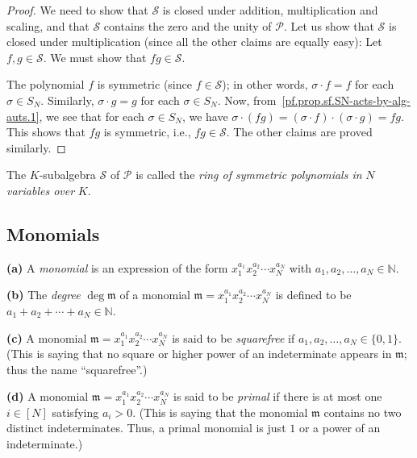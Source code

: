 \begin{proof}
\leanok
We need to show that $\mathcal{S}$ is closed under addition, multiplication and scaling, and that
$\mathcal{S}$ contains the zero and the unity of $\mathcal{P}$. Let us show
that $\mathcal{S}$ is closed under multiplication (since all the other
claims are equally easy): Let $f, g \in \mathcal{S}$. We must show that
$fg \in \mathcal{S}$.

The polynomial $f$ is symmetric (since $f \in \mathcal{S}$); in other words,
$\sigma \cdot f = f$ for each $\sigma \in S_N$. Similarly, $\sigma \cdot g = g$ for
each $\sigma \in S_N$. Now, from~\eqref{pf.prop.sf.SN-acts-by-alg-auts.1}, we
see that
for each $\sigma \in S_N$, we have
$\sigma \cdot (fg) = (\sigma \cdot f) \cdot (\sigma \cdot g) = fg$.
This shows that $fg$ is symmetric, i.e., $fg \in \mathcal{S}$.
The other claims are proved similarly.
\end{proof}

\begin{definition}
\label{def.sf.ring-of-symm}
\leantarget
\leanok
The $K$-subalgebra $\mathcal{S}$ of $\mathcal{P}$
is called the \emph{ring of symmetric polynomials in} $N$ \emph{variables over} $K$.
\end{definition}

\subsection{Monomials}

\begin{definition}
\label{def.sf.monomial}
\leantarget
\leanok
\textbf{(a)} A \emph{monomial} is an expression of the
form $x_1^{a_1} x_2^{a_2} \cdots x_N^{a_N}$ with $a_1, a_2, \ldots, a_N \in \mathbb{N}$. \medskip

\textbf{(b)} The \emph{degree} $\deg \mathfrak{m}$
of a monomial $\mathfrak{m} = x_1^{a_1} x_2^{a_2} \cdots x_N^{a_N}$
is defined to be $a_1 + a_2 + \cdots + a_N \in \mathbb{N}$. \medskip

\textbf{(c)} A monomial $\mathfrak{m} = x_1^{a_1} x_2^{a_2} \cdots x_N^{a_N}$
is said to be \emph{squarefree} if $a_1, a_2, \ldots, a_N \in \{0,1\}$.
(This is saying that no square or higher power of
an indeterminate appears in $\mathfrak{m}$; thus the name ``squarefree''.) \medskip

\textbf{(d)} A monomial $\mathfrak{m} = x_1^{a_1} x_2^{a_2} \cdots x_N^{a_N}$
is said to be \emph{primal} if there is at most one
$i \in [N]$ satisfying $a_i > 0$. (This is saying that the
monomial $\mathfrak{m}$ contains no two distinct indeterminates. Thus, a
primal monomial is just $1$ or a power of an indeterminate.)
\end{definition}

